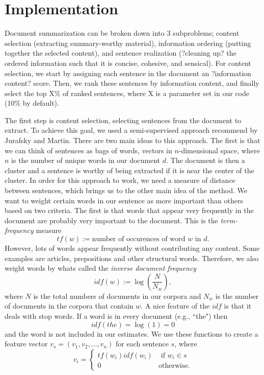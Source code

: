 \documentclass[12pt]{article}
\theoremstyle{plain}
\theoremstyle{definition}
\theoremstyle{remark}
\theoremstyle{plain}
\begin{document}
\section{Implementation}
Document summarization can be broken down into 3 subproblems; content selection (extracting summary-worthy material), information ordering (putting together the selected content), and sentence realization (?cleaning up? the ordered information such that it is concise, cohesive, and sensical). For content selection, we start by assigning each sentence in the document an ?information content? score. Then, we rank these sentences by information content, and finally select the top X\% of ranked sentences, where X is a parameter set in our code (10\% by default).

The first step is content selection, selecting sentences from the document to extract. To achieve this goal, we used a semi-supervised approach recommend by Jurafsky and Martin. There are two main ideas to this approach. The first is that we can think of sentences as bags of words, vectors in $n$-dimensional space, where $n$ is the number of unique words in our document $d$. The document is then a cluster and a sentence is worthy of being extracted if it is near the center of the cluster. In order for this approach to work, we need a measure of distance between sentences, which brings us to the other main idea of the method. We want to weight certain words in our sentence as more important than others based on two criteria. The first is that words that appear very frequently in the document are probably very important to the document. This is the \emph{term-frequency} measure
$$tf(w) := \text{number of occurences of word $w$ in $d$}.$$ However, lots of words appear frequently without contributing any content. Some examples are articles, prepositions and other structural words. Therefore, we also weight words by whats called the \emph{inverse document frequency}
$$idf(w) := \log\left(\frac{N}{N_w}\right),$$
where $N$ is the total numbers of documents in our corpora and $N_w$ is the number of documents in the corpora that contain $w$. A nice feature of the $idf$ is that it deals with stop words. If a word is in every document (e.g., ``the") then 
$$idf(the) = \log(1) = 0$$
and the word is not included in our estimates.
We use these functions to create a feature vector $v_s = (v_1,v_2,\dots,v_n)$ for each sentence $s$, where
$$v_i =\begin{cases}
tf(w_i)idf(w_i) & \text{ if } w_i\in s\\
0 &\text{otherwise.}
\end{cases}$$
\end{document}

